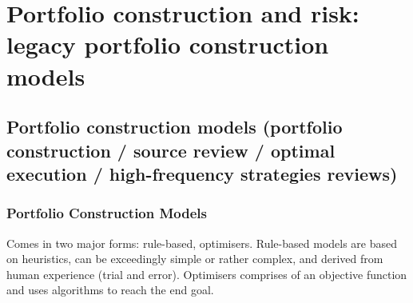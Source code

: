 \documentclass[a4paper,oneside,openany]{book}
\begin{document}
\chapter*{Portfolio construction and risk: legacy portfolio construction models}

\section*{Portfolio construction models (portfolio construction / source review / optimal execution / high-frequency strategies reviews)}

\subsection*{Portfolio Construction Models}

Comes in two major forms: rule-based, optimisers. Rule-based models are based on heuristics, can be exceedingly simple or rather complex, and derived from human experience (trial and error). Optimisers comprises of an objective function and uses algorithms to reach the end goal.
\end{document}
